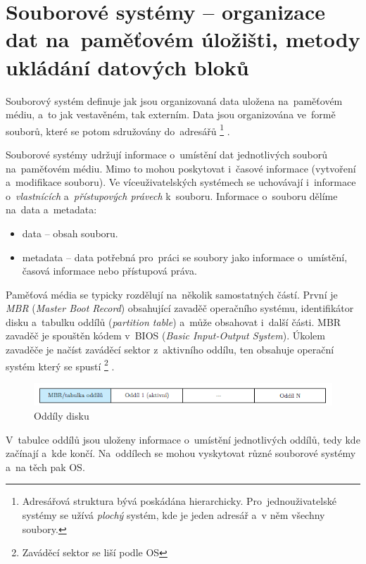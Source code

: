 
\clearpage
\section{Souborové systémy -- organizace dat na~paměťovém úložišti, metody ukládání datových bloků}

Souborový systém definuje jak jsou organizovaná data uložena na~paměťovém médiu, a~to jak vestavěném, tak externím. Data jsou organizována ve~formě souborů, které se potom sdružovány do~adresářů%
\footnote{Adresářová struktura bývá poskádána hierarchicky. Pro~jednouživatelské systémy se užívá \emph{plochý} systém, kde je jeden adresář a~v něm všechny soubory.}%
.

Souborové systémy udržují informace o~umístění dat jednotlivých souborů na~paměťovém médiu. Mimo to mohou poskytovat i~časové informace (vytvoření a~modifikace souboru). Ve víceuživatelských systémech se uchovávají i~informace o~\emph{vlastnících} a~\emph{přístupových právech} k~souboru. Informace o~souboru dělíme na~data a~metadata:

\begin{itemize}[noitemsep]
	\item data -- obsah souboru.
	\item metadata -- data potřebná pro~práci se soubory jako informace o~umístění, časová informace nebo přístupová práva.
\end{itemize}

Paměťová média se typicky rozdělují na~několik samostatných částí. První je \emph{MBR} (\emph{Master Boot Record}) obsahující zavaděč operačního systému, identifikátor disku a~tabulku oddílů (\emph{partition table}) a~může obsahovat i~další části. MBR zavaděč je spouštěn kódem v~BIOS (\emph{Basic Input-Output System}). Úkolem zavaděče je načíst zaváděcí sektor z~aktivního oddílu, ten obsahuje operační systém který se spustí%
\footnote{Zaváděcí sektor se liší podle OS}%
.

\begin{figure}[ht]
	\centering
	\includegraphics[scale=1]{images/mem_partitions.png}
	\caption{Oddíly disku}
	\label{mem_partitions}
\end{figure}

V~tabulce oddílů jsou uloženy informace o~umístění jednotlivých oddílů, tedy kde začínají a~kde končí. Na~oddílech se mohou vyskytovat různé souborové systémy a~na těch pak OS.


